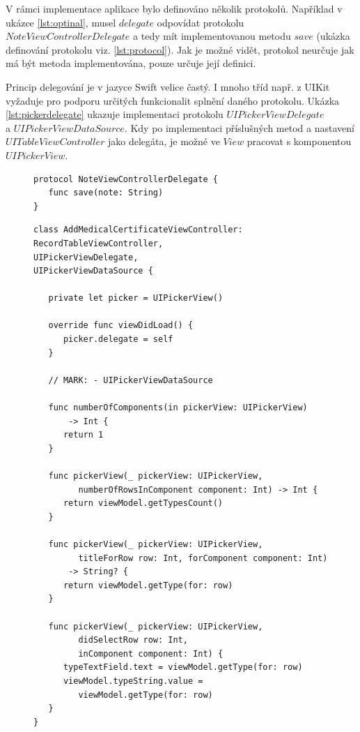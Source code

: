 \documentclass[thesis=M,czech]{FITthesis}[2012/06/26]
\begin{document}
V rámci implementace aplikace bylo definováno několik protokolů. Například v ukázce \ref{lst:optinal}, musel $delegate$ odpovídat protokolu\\ $NoteViewControllerDelegate$ a tedy mít implementovanou metodu $save$ (ukázka definování protokolu viz. \ref{lst:protocol}). Jak je možné vidět, protokol neurčuje jak má být metoda implementována, pouze určuje její definici.

Princip delegování je v jazyce Swift velice častý. I mnoho tříd např. z UIKit vyžaduje pro podporu určitých funkcionalit splnění daného protokolu. Ukázka \ref{lst:pickerdelegate} ukazuje implementaci protokolu $UIPickerViewDelegate$\\ a $UIPickerViewDataSource$. Kdy po implementaci příslušných metod a nastavení $UITableViewController$ jako delegáta, je možné ve $View$ pracovat s komponentou $UIPickerView$.
	
\begin{figure}
\begin{minipage}{\linewidth}
\begin{lstlisting}[caption={Definice protokolu},label={lst:protocol}]
protocol NoteViewControllerDelegate {
   func save(note: String)
}
\end{lstlisting}
\end{minipage}
\end{figure}	

\begin{figure}
\begin{minipage}{\linewidth}
\begin{lstlisting}[caption={Implementace protokolu},label={lst:pickerdelegate}]
class AddMedicalCertificateViewController: 
RecordTableViewController, 
UIPickerViewDelegate, 
UIPickerViewDataSource {

   private let picker = UIPickerView()

   override func viewDidLoad() {
      picker.delegate = self
   }

   // MARK: - UIPickerViewDataSource

   func numberOfComponents(in pickerView: UIPickerView) 
       -> Int {
      return 1
   }

   func pickerView(_ pickerView: UIPickerView, 
         numberOfRowsInComponent component: Int) -> Int {
      return viewModel.getTypesCount()
   }

   func pickerView(_ pickerView: UIPickerView, 
         titleForRow row: Int, forComponent component: Int)
       -> String? {
      return viewModel.getType(for: row)
   }

   func pickerView(_ pickerView: UIPickerView, 
         didSelectRow row: Int, 
         inComponent component: Int) {
      typeTextField.text = viewModel.getType(for: row)
      viewModel.typeString.value = 
         viewModel.getType(for: row)
   }
}
\end{lstlisting}
\end{minipage}
\end{figure}	
	
\end{document}
